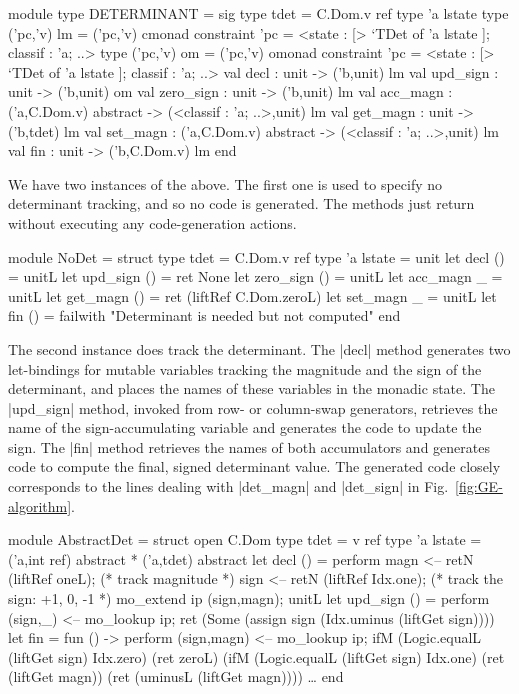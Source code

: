 \documentclass{elsart}
\begin{document}
\begin{code}
module type DETERMINANT = sig
  type tdet = C.Dom.v ref
  type 'a lstate
  type ('pc,'v) lm = ('pc,'v) cmonad
    constraint 'pc = <state : [> `TDet of 'a lstate ]; classif : 'a; ..>
  type ('pc,'v) om = ('pc,'v) omonad
    constraint 'pc = <state : [> `TDet of 'a lstate ]; classif : 'a; ..>
  val decl      : unit -> ('b,unit) lm
  val upd_sign  : unit -> ('b,unit) om
  val zero_sign : unit -> ('b,unit) lm
  val acc_magn  : ('a,C.Dom.v) abstract -> (<classif : 'a; ..>,unit) lm
  val get_magn  : unit -> ('b,tdet) lm
  val set_magn  : ('a,C.Dom.v) abstract -> (<classif : 'a; ..>,unit) lm
  val fin       : unit -> ('b,C.Dom.v) lm
end
\end{code}

We have two instances of the above. The first one is used to specify
no determinant tracking, and so no code is
generated. The methods just return without executing any
code-generation actions.
\begin{code}
module NoDet =
  struct
  type tdet = C.Dom.v ref
  type 'a lstate = unit
  let decl () = unitL
  let upd_sign () = ret None
  let zero_sign () = unitL
  let acc_magn _ = unitL
  let get_magn () = ret (liftRef C.Dom.zeroL)
  let set_magn _ = unitL
  let fin () = failwith "Determinant is needed but not computed"
end
\end{code}

The second instance does track the determinant. The |decl| method
generates two let-bindings for mutable variables tracking the
magnitude and the sign of the determinant, and places the names of
these variables in the monadic state. The |upd_sign| method, invoked
from row- or column-swap generators, retrieves the name of the
sign-accumulating variable and generates the code to update the
sign. The |fin| method retrieves the names of both accumulators and
generates code to compute the final, signed determinant value.
The generated code closely corresponds to the lines dealing with 
|det_magn| and |det_sign| in Fig.~\ref{fig:GE-algorithm}.
\begin{code}
module AbstractDet =
  struct
  open C.Dom
  type tdet = v ref
  type 'a lstate = ('a,int ref) abstract * ('a,tdet) abstract
  let decl () = perform
      magn <-- retN (liftRef oneL);    (* track magnitude *)
      sign <-- retN (liftRef Idx.one); (* track the sign: +1, 0, -1 *)
      mo_extend ip (sign,magn);
      unitL
  let upd_sign () = perform
      (sign,_) <-- mo_lookup ip;
      ret (Some (assign sign (Idx.uminus (liftGet sign))))
  let fin = fun () -> perform
      (sign,magn) <-- mo_lookup ip;
      ifM (Logic.equalL (liftGet sign) Idx.zero) (ret zeroL)
      (ifM (Logic.equalL (liftGet sign) Idx.one) (ret (liftGet magn))
          (ret (uminusL (liftGet magn))))
  \dots
end
\end{code}
\end{document}
